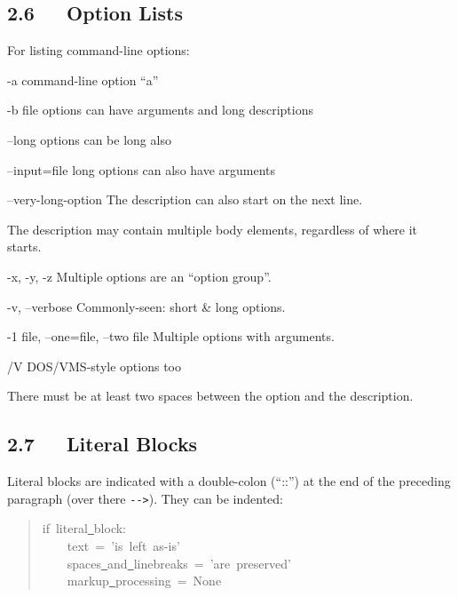 \documentclass[10pt,a4paper,english]{article}
\newcommand{\optionlistlabel}[1]{\bf #1 \hfill}
\newenvironment{optionlist}[1]
{\begin{list}{}
  {\setlength{\labelwidth}{#1}
   \setlength{\rightmargin}{1cm}
   \setlength{\leftmargin}{\rightmargin}
   \addtolength{\leftmargin}{\labelwidth}
   \addtolength{\leftmargin}{\labelsep}
   \renewcommand{\makelabel}{\optionlistlabel}}
}{\end{list}}
\begin{document}

\hypertarget{option-lists}{}
\subsection*{2.6~~~Option Lists}

For listing command-line options:
\begin{optionlist}{3cm}
\item [-a]  
command-line option ``a''
\item [-b file]  
options can have arguments
and long descriptions
\item [--long]  
options can be long also
\item [--input=file]  
long options can also have
arguments
\item [--very-long-option]  
The description can also start on the next line.

The description may contain multiple body elements,
regardless of where it starts.
\item [-x, -y, -z]  
Multiple options are an ``option group''.
\item [-v, --verbose]  
Commonly-seen: short {\&} long options.
\item [-1 file, --one=file, --two file]  
Multiple options with arguments.
\item [/V]  
DOS/VMS-style options too
\end{optionlist}

There must be at least two spaces between the option and the
description.



\hypertarget{literal-blocks}{}
\subsection*{2.7~~~Literal Blocks}

Literal blocks are indicated with a double-colon (``::'') at the end of
the preceding paragraph (over there \texttt{-{}->}).  They can be indented:
\begin{quote}{\ttfamily \raggedright \noindent
if~literal{\underline{~}}block:~\\
~~~~text~=~'is~left~as-is'~\\
~~~~spaces{\underline{~}}and{\underline{~}}linebreaks~=~'are~preserved'~\\
~~~~markup{\underline{~}}processing~=~None
}\end{quote}
\end{document}
